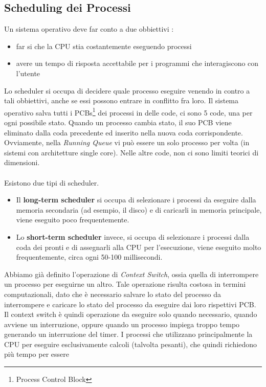 \documentclass[12pt, letterpaper]{article}
\begin{document}
\subsection{Scheduling dei Processi}
Un sistema operativo deve far conto a due obbiettivi : \begin{itemize}
    \item far si che la CPU stia costantemente eseguendo processi 
    \item avere un tempo di risposta accettabile per i programmi che interagiscono con l'utente
\end{itemize}
Lo scheduler si occupa di decidere quale processo eseguire venendo in contro a tali obbiettivi, anche se 
essi possono entrare in conflitto fra loro. Il sistema operativo salva tutti i PCBs\footnote{
 Process Control Block
} dei processi in delle code, ci sono 5 code, una per ogni possibile stato. Quando un processo cambia stato, 
il suo PCB viene eliminato dalla coda precedente ed inserito nella nuova coda corrispondente. Ovviamente, 
nella \textit{Running Queue} vi può essere un solo processo per volta (in sistemi con architetture single core).
Nelle altre code, non ci sono limiti teorici di dimensioni.
\\\hphantom{}\\ 
Esistono due tipi di scheduler.\begin{itemize}
    \item Il \textbf{long-term scheduler} si occupa di selezionare i processi da eseguire dalla memoria secondaria 
    (ad esempio, il disco) e di caricarli in memoria principale, viene eseguito poco frequentemente.
    \item Lo \textbf{short-term scheduler} invece, si occupa di selezionare i
     processi dalla coda dei pronti e di assegnarli alla CPU per l'esecuzione, viene eseguito molto frequentemente,
     circa ogni 50-100 millisecondi.
\end{itemize}
Abbiamo già definito l'operazione di \textit{Context Switch}, ossia quella di interrompere un processo per 
eseguirne un altro. Tale operazione risulta costosa in termini computazionali, dato che è necessario salvare 
lo stato del processo da interrompere e caricare lo stato del processo da eseguire dai loro rispettivi 
PCB. Il context switch è quindi operazione da eseguire solo quando necessario, quando avviene un interruzione, oppure 
quando un processo impiega troppo tempo generando un interruzione del timer. I processi che utilizzano principalmente 
la CPU per eseguire esclusivamente calcoli (talvolta pesanti), che quindi richiedono più tempo per essere 
\end{document}
